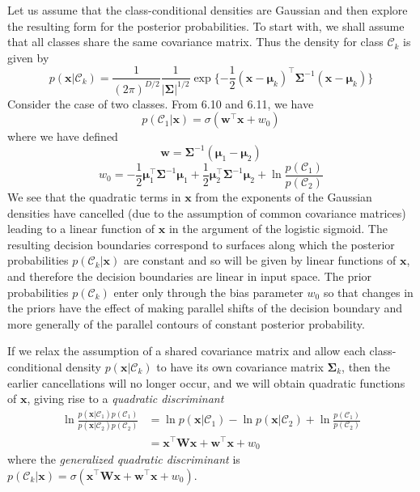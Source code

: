 \documentclass[twoside]{article}
\begin{document}
Let us assume that the class-conditional densities are Gaussian and then explore the resulting form for the posterior probabilities. To start with, we shall assume that all classes share the same covariance matrix. Thus the density for class $\mathcal{C}_k$ is given by
\begin{equation*}
    p(\boldsymbol{x}|\mathcal{C}_k) = \frac{1}{(2\pi)^{D/2}}\frac{1}{|\boldsymbol{\Sigma}|^{1/2}}\exp{\{-\frac{1}{2}(\boldsymbol{x} - \boldsymbol{\mu}_k)^\intercal\boldsymbol{\Sigma}^{-1}(\boldsymbol{x} - \boldsymbol{\mu}_k)\}}
\end{equation*}
Consider the case of two classes. From 6.10 and 6.11, we have
\begin{equation*}
    p(\mathcal{C}_1|\boldsymbol{x}) = \sigma(\boldsymbol{w ^\intercal x} + w_0)
\end{equation*}
where we have defined
\begin{equation*}
    \boldsymbol{w} = \boldsymbol{\Sigma}^{-1}(\boldsymbol{\mu}_1 - \boldsymbol{\mu}_2)
\end{equation*}
\begin{equation*}
    w_0 = -\frac{1}{2}\boldsymbol{\mu}_1^\intercal \boldsymbol{\Sigma}^{-1}\boldsymbol{\mu}_1 + \frac{1}{2}\boldsymbol{\mu}_2^\intercal \boldsymbol{\Sigma}^{-1}\boldsymbol{\mu}_2 + \ln{\frac{p(\mathcal{C}_1)}{p(\mathcal{C}_2)}}
\end{equation*}
We see that the quadratic terms in $\boldsymbol{x}$ from the exponents of the Gaussian densities have cancelled (due to the assumption of common covariance matrices) leading to a linear function of $\boldsymbol{x}$ in the argument of the logistic sigmoid. The resulting decision boundaries correspond to surfaces along which the posterior probabilities $p(\mathcal{C}_k|\boldsymbol{x})$ are constant and so will be given by linear functions of $\boldsymbol{x}$, and therefore the decision boundaries are linear in input space. The prior probabilities $p(\mathcal{C}_k)$ enter only through the bias parameter $w_0$ so that changes in the priors have the effect of making parallel shifts of the decision boundary and more generally of the parallel contours of constant posterior probability.\medskip

If we relax the assumption of a shared covariance matrix and allow each class-conditional density $p(\boldsymbol{x}|\mathcal{C}_k)$ to have its own covariance matrix $\boldsymbol{\Sigma}_k$, then the earlier cancellations will no longer occur, and we will obtain quadratic functions of $\boldsymbol{x}$, giving rise to a \textit{quadratic discriminant}
\begin{equation*}
\begin{aligned}
    \ln{\frac{p(\boldsymbol{x}|\mathcal{C}_1)p(\mathcal{C}_1)}{p(\boldsymbol{x}|\mathcal{C}_2)p(\mathcal{C}_2)}} &= \ln{p(\boldsymbol{x}|\mathcal{C}_1)} - \ln{p(\boldsymbol{x}|\mathcal{C}_2)} + \ln{\frac{p(\mathcal{C}_1)}{p(\mathcal{C}_2)}}\\
    &= \boldsymbol{x^\intercal W x} + \boldsymbol{w^\intercal x} + w_0
\end{aligned}
\end{equation*}
where the \textit{generalized quadratic discriminant} is $p(\mathcal{C}_k|\boldsymbol{x}) = \sigma(\boldsymbol{x^\intercal W x} + \boldsymbol{w^\intercal x} + w_0)$.
\end{document}
